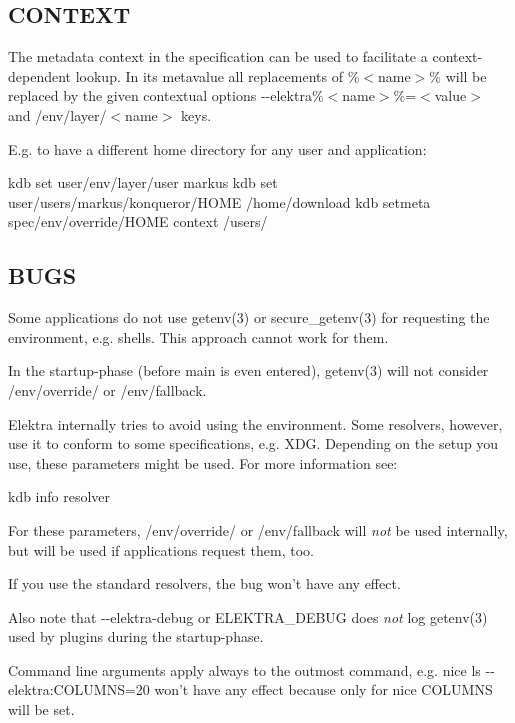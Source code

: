 \subsection*{C\+O\+N\+T\+E\+X\+T}

The metadata {\ttfamily context} in the specification can be used to facilitate a context-\/dependent lookup. In its metavalue all replacements of {\ttfamily \%$<$name$>$\%} will be replaced by the given contextual options {\ttfamily -\/-\/elektra\%$<$name$>$\%=$<$value$>$} and {\ttfamily /env/layer/$<$name$>$} keys.

E.\+g. to have a different home directory for any user and application\+: \begin{DoxyVerb}kdb set user/env/layer/user markus
kdb set user/users/markus/konqueror/HOME /home/download
kdb setmeta spec/env/override/HOME context  /users/%
\end{DoxyVerb}


\subsection*{B\+U\+G\+S}

Some applications do not use {\ttfamily getenv(3)} or {\ttfamily secure\+\_\+getenv(3)} for requesting the environment, e.\+g. shells. This approach cannot work for them.

In the startup-\/phase (before main is even entered), {\ttfamily getenv(3)} will not consider {\ttfamily /env/override/} or {\ttfamily /env/fallback}.

Elektra internally tries to avoid using the environment. Some resolvers, however, use it to conform to some specifications, e.\+g. X\+D\+G. Depending on the setup you use, these parameters might be used. For more information see\+: \begin{DoxyVerb}kdb info resolver
\end{DoxyVerb}


For these parameters, {\ttfamily /env/override/} or {\ttfamily /env/fallback} will {\itshape not} be used internally, but will be used if applications request them, too.

If you use the standard resolvers, the bug won't have any effect.

Also note that {\ttfamily -\/-\/elektra-\/debug} or {\ttfamily E\+L\+E\+K\+T\+R\+A\+\_\+\+D\+E\+B\+U\+G} does {\itshape not} log {\ttfamily getenv(3)} used by plugins during the startup-\/phase.

Command line arguments apply always to the outmost command, e.\+g. {\ttfamily nice ls -\/-\/elektra\+:C\+O\+L\+U\+M\+N\+S=20} won't have any effect because only for {\ttfamily nice} {\ttfamily C\+O\+L\+U\+M\+N\+S} will be set.

